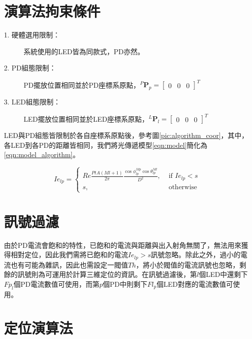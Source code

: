 \section{演算法拘束條件}
\label{chp:algorithm_constraint}

    \begin{description}

        \item[1. 硬體選用限制：]系統使用的LED皆為同款式，PD亦然。
        \item[2. PD組態限制：]PD擺放位置相同並於PD座標系原點，$^P\boldsymbol{P}_p=
        \left[\begin{array}{ccc}0&0&0\end{array}\right]^T$
        \item[3. LED組態限制：]LED擺放位置相同並於LED座標系原點，$^L\boldsymbol{P}_l=
        \left[\begin{array}{ccc}0&0&0\end{array}\right]^T$

    \end{description}
   
    

    LED與PD組態皆限制於各自座標系原點後，參考圖\ref{pic:algorithm_coor}，其中，各LED到各PD的距離皆相同，我們將光傳遞模型\ref{eqn:model}簡化為\ref{eqn:model_algorithm}。

    \begin{equation}
        \label{eqn:model_algorithm}
        Ie_{lp} = \begin{cases}Re\frac{PtA(Ml+1)}{2\pi}\frac{\cos\phi_{lp}^{Mp}\cos \theta_{lp}^{Ml}}{D^2} , & \text { if } Ie_{lp}<s \\ s, & \text { otherwise }\end{cases}
    \end{equation}


\section{訊號過濾}
\label{chp:algorithm_filter}

由於PD電流會飽和的特性，已飽和的電流與距離與出入射角無關了，無法用來獲得相對定位，因此我們需將已飽和的電流$Ie_{lp}>s$訊號忽略。除此之外，過小的電流也有可能為雜訊，因此也需設定一閥值$Th$，將小於閥值的電流訊號也忽略，剩餘的訊號則為可運用於計算三維定位的資訊。在訊號過濾後，第$l$個LED中還剩下$Fp_l$個PD電流數值可使用，而第$p$個PD中則剩下$Fl_p$個LED對應的電流數值可使用。



\section{定位演算法}
\label{chp:algorithm}

